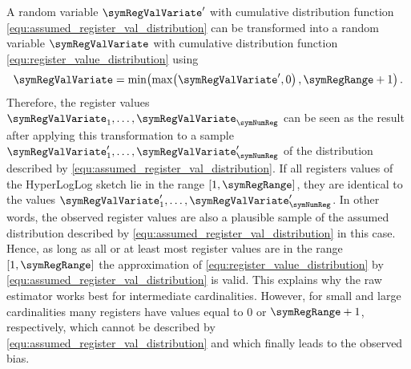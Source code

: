 \documentclass[a4paper]{scrartcl}
\begin{document}
A random variable $\symRegValVariate'$ with cumulative distribution function \eqref{equ:assumed_register_val_distribution} can be transformed into a random variable $\symRegValVariate$ with cumulative distribution function \eqref{equ:register_value_distribution} using
\begin{equation}
\label{equ:dist_transformation}
\symRegValVariate = \min\!\left(\max\!\left(\symRegValVariate', 0\right), \symRegRange+1\right).
\end{equation}
Therefore, the register values $\symRegValVariate_1,\ldots,\symRegValVariate_\symNumReg$ can be seen as the result after applying this transformation to a sample $\symRegValVariate'_1,\ldots,\symRegValVariate'_\symNumReg$ of the distribution described by \eqref{equ:assumed_register_val_distribution}. If all registers values of the HyperLogLog sketch lie in the range $[1,\symRegRange]$, they are identical to the values $\symRegValVariate'_1,\ldots,\symRegValVariate'_\symNumReg$. In other words, the observed register values are also a plausible sample of the assumed distribution described by \eqref{equ:assumed_register_val_distribution} in this case. Hence, as long as all or at least most register values are in the range $[1,\symRegRange]$ the approximation of \eqref{equ:register_value_distribution} by \eqref{equ:assumed_register_val_distribution} is valid. This explains why the raw estimator works best for intermediate cardinalities. However, for small and large cardinalities many registers have values equal to 0 or $\symRegRange+1$, respectively, which cannot be described by \eqref{equ:assumed_register_val_distribution} and which finally leads to the observed bias.
\end{document}
